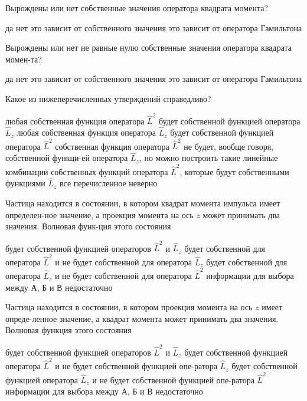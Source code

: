 \documentclass[11pt,a4paper]{exam}
\begin{document}
\begin{questions}
\question Вырождены или нет собственные значения оператора квадрата момента?
\begin{choices}
\choice да
\choice нет
\choice это зависит от собственного значения
\choice это зависит от оператора Гамильтона
\end{choices}

\question Вырождены или нет не равные нулю собственные значения оператора квадрата момен-та?
\begin{choices}
\choice да
\choice нет
\choice это зависит от собственного значения
\choice это зависит от оператора Гамильтона
\end{choices}

\question Какое из нижеперечисленных утверждений справедливо?
\begin{choices}
\choice любая собственная функция оператора ${\hat L^2}$ будет собственной функцией оператора ${\hat L_z}$
\choice любая собственная функция оператора ${\hat L_z}$ будет собственной функцией  оператора ${\hat L^2}$
\choice собственная функция оператора ${\hat L^2}$ не будет, вообще говоря, собственной функци-ей оператора ${\hat L_z}$, но можно построить такие линейные комбинации собственных функций оператора ${\hat L^2}$, которые будут собственными функциями ${\hat L_z}$
\choice все перечисленное неверно
\end{choices}

\question Частица находится в состоянии, в котором квадрат момента импульса имеет определен-ное значение, а проекция момента на ось $z$ может принимать два значения. Волновая функ-ция этого состояния
\begin{choices}
\choice будет собственной функцией операторов ${\hat L^2}$ и ${\hat L_z}$
\choice будет собственной для оператора ${\hat L^2}$ и не будет собственной для оператора ${\hat L_z}$
\choice будет собственной для оператора ${\hat L_z}$ и не будет собственной для оператора ${\hat L^2}$
\choice информации для выбора между А, Б и В недостаточно
\end{choices}

\question Частица находится в состоянии, в котором проекция момента на ось $z$ имеет опреде-ленное значение, а квадрат момента может принимать два значения. Волновая функция этого состояния
\begin{choices}
\choice будет собственной функцией операторов ${\hat L^2}$ и ${\hat L_z}$
\choice будет собственной функцией оператора ${\hat L^2}$ и не будет собственной функцией опе-ратора ${\hat L_z}$
\choice будет собственной функцией оператора ${\hat L_z}$ и не будет собственной функцией опе-ратора ${\hat L^2}$
\choice информации для выбора между А, Б и В недостаточно
\end{choices}


\end{questions}
\end{document}
